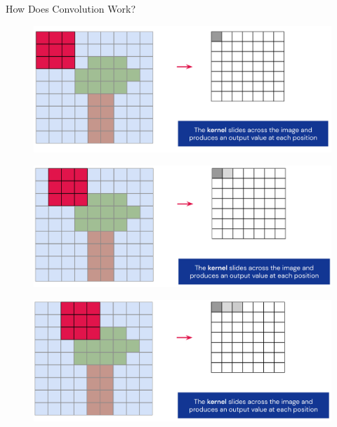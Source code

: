 \begin{frame}[allowframebreaks]{How Does Convolution Work?}
\framebreak

\begin{figure}
\centering
\includegraphics[width=1.0\textwidth,height=0.9\textheight,keepaspectratio]{images/cnn/conv_7.png}
\end{figure}

\framebreak

\begin{figure}
\centering
\includegraphics[width=1.0\textwidth,height=0.9\textheight,keepaspectratio]{images/cnn/conv_8.png}
\end{figure}

\framebreak

\begin{figure}
\centering
\includegraphics[width=1.0\textwidth,height=0.9\textheight,keepaspectratio]{images/cnn/conv_9.png}
\end{figure}

\framebreak


\end{frame}
